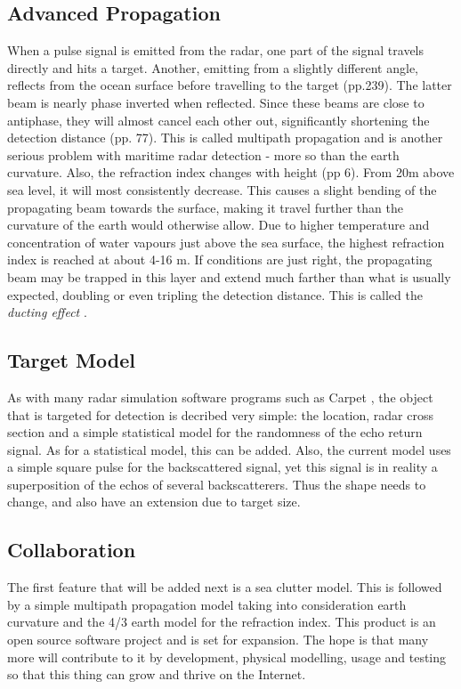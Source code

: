 \documentclass[letterpaper]{book}
\begin{document}
\subsection{Advanced Propagation}
When a pulse signal is emitted from the radar, one part of the signal travels directly and hits a target. Another, emitting from a slightly different angle, reflects from the ocean surface before travelling to the target \cite{ref:skolnik} (pp.239). The latter beam is nearly phase inverted when reflected. Since these beams are close to antiphase, they will almost cancel each other out, significantly shortening the detection distance \cite{ref:levanon} (pp. 77). This is called multipath propagation and is another serious problem with maritime radar detection - more so than the earth curvature. Also, the refraction index changes with height \cite{ref:levanon} (pp 6). From 20m above sea level, it will most consistently decrease. This causes a slight bending of the propagating beam towards the surface, making it travel further than the curvature of the earth would otherwise allow. Due to higher temperature and concentration of water vapours just above the sea surface, the highest refraction index is reached at about 4-16 m. If conditions are just right, the propagating beam may be trapped in this layer and extend much farther than what is usually expected, doubling or even tripling the detection distance. This is called the \textit{ducting effect} \cite{ref:anderson}.

\subsection{Target Model}
As with many radar simulation software programs such as Carpet \cite{ref:carpet}, the object that is targeted for detection is decribed very simple: the location, radar cross section and a simple statistical model for the randomness of the echo return signal. As for a statistical model, this can be added. Also, the current model uses a simple square pulse for the backscattered signal, yet this signal is in reality a superposition of the echos of several backscatterers. Thus the shape needs to change, and also have an extension due to target size.

\subsection{Collaboration}
The first feature that will be added next is a sea clutter model. This is followed by a simple multipath propagation model taking into consideration earth curvature and the 4/3 earth model for the refraction index. This product is an open source software project and is set for expansion. The hope is that many more will contribute to it by development, physical modelling, usage and testing so that this thing can grow and thrive on the Internet. 
\end{document}
